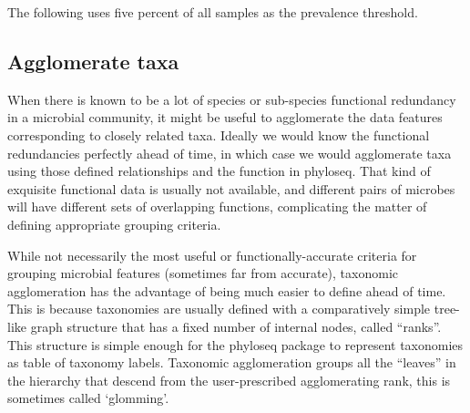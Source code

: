 The following uses five percent of all samples
as the prevalence threshold.

\begin{knitrout}
\color{fgcolor}
\end{knitrout}


\subsection*{Agglomerate taxa}

When there is known to be a lot of
species or sub-species functional redundancy
in a microbial community,
it might be useful to agglomerate the data features
corresponding to closely related taxa.
Ideally we would know the functional redundancies perfectly ahead of time,
in which case we would agglomerate taxa using those defined relationships
and the  function in phyloseq.
That kind of exquisite functional data is usually not available,
and different pairs of microbes will have different sets of overlapping functions,
complicating the matter of defining appropriate grouping criteria.

While not necessarily the most useful or functionally-accurate
criteria for grouping microbial features
(sometimes far from accurate),
taxonomic agglomeration has the advantage of being much easier to define ahead of time.
This is because taxonomies are usually defined
with a comparatively simple tree-like graph structure
that has a fixed number of internal nodes, called ``ranks''.
This structure is simple enough for the phyloseq package
to represent taxonomies as table of taxonomy labels.
Taxonomic agglomeration groups all the ``leaves'' in the hierarchy
that descend from the user-prescribed agglomerating rank, this is sometimes called
`glomming'.

